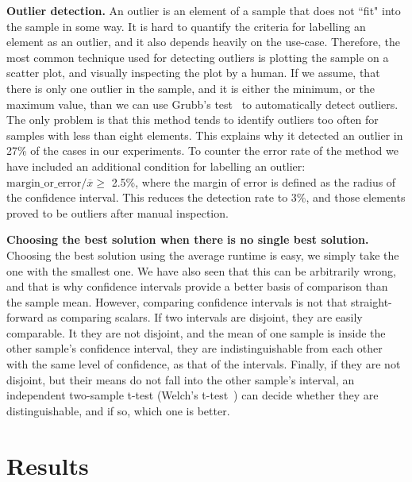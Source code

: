\documentclass{sig-alternate}
\begin{document}
\noindent\textbf{Outlier detection.}
An outlier is an element of a sample that does not ``fit" into the sample in some way. It is hard to quantify the criteria for labelling an element as an outlier, and it also depends heavily on the use-case. Therefore, the most common technique used for detecting outliers is plotting the sample on a scatter plot, and visually inspecting the plot by a human.
If we assume, that there is only one outlier in the sample, and it is either the minimum, or the maximum value, than we can use Grubb's test~\cite{grubbs1950sample} to automatically detect outliers. The only problem is that this method tends to identify outliers too often for samples with less than eight elements. This explains why it detected an outlier in 27\% of the cases in our experiments. To counter the error rate of the method we have included an additional condition for labelling an outlier: $\text{margin\_or\_error} / \overline{x} \geq$ 2.5\%, where the margin of error is defined as the radius of the confidence interval. This reduces the detection rate to 3\%, and those elements proved to be outliers after manual inspection.

\noindent\textbf{Choosing the best solution when there is no single best solution.}
Choosing the best solution using the average runtime is easy, we simply take the one with the smallest one. We have also seen that this can be arbitrarily wrong, and that is why confidence intervals provide a better basis of comparison than the sample mean. 
However, comparing confidence intervals is not that straight-forward as comparing scalars. If two intervals are disjoint, they are easily comparable. It they are not disjoint, and the mean of one sample is inside the other sample's confidence interval, they are indistinguishable from each other with the same level of confidence, as that of the intervals. Finally, if they are not disjoint, but their means do not fall into the other sample's interval, an independent two-sample t-test (Welch's t-test~\cite{welch1947generalization}) can decide whether they are distinguishable, and if so, which one is better.

\vspace*{-0.2cm}

\section{Results}
\end{document}
